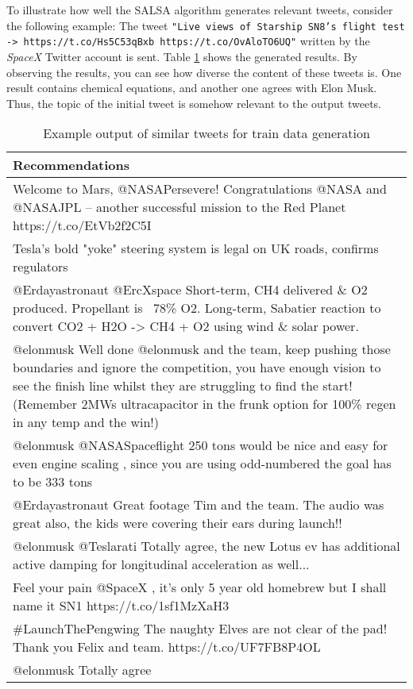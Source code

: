 To illustrate how well the SALSA algorithm generates relevant tweets, consider the following example:
The tweet \texttt{"Live views of Starship SN8’s flight test -> https://t.co/Hs5C53qBxb https://t.co/OvAloTO6UQ"} written by the \emph{SpaceX} Twitter account is sent. Table \ref{tab:example-train-data} shows the generated results. By observing the results, you can see how diverse the content of these tweets is. One result contains chemical equations, and another one agrees with Elon Musk. Thus, the topic of the initial tweet is somehow relevant to the output tweets.

\begin{table}[!ht]
    \centering
    \caption{Example output of similar tweets for train data generation}
    \label{tab:example-train-data}
    \begin{tabular}{|m{}|}
        \hline
        \textbf{Recommendations} \\
        \hline
        Welcome to Mars, @NASAPersevere! Congratulations @NASA and @NASAJPL – another successful mission to the Red Planet https://t.co/EtVb2f2C5I \\
        \hline
        Tesla’s bold "yoke" steering system is legal on UK roads, confirms regulators \\
        \hline
        @Erdayastronaut @ErcXspace Short-term, CH4 delivered \& O2 produced. Propellant is ~78\% O2. Long-term, Sabatier reaction to convert CO2 + H2O -> CH4 + O2 using wind \& solar power. \\
        \hline
        @elonmusk Well done @elonmusk and the team, keep pushing those boundaries and ignore the competition,  you have enough vision to see the finish line whilst they are struggling to find the start! (Remember 2MWs ultracapacitor in the frunk option for 100\% regen in any temp and the win!) \\
        \hline
        @elonmusk @NASASpaceflight 250 tons would be nice and easy for even engine scaling , since you are using odd-numbered the goal has to be 333 tons \\
        \hline
        @Erdayastronaut Great footage Tim and the team. The audio was great also,  the kids were covering their ears during launch!! \\
        \hline
        @elonmusk @Teslarati Totally agree, the new Lotus ev has additional active damping for longitudinal acceleration as well... \\
        \hline
        Feel your pain @SpaceX , it's only 5 year old homebrew but I shall name it SN1 https://t.co/1sf1MzXaH3 \\
        \hline
        \#LaunchThePengwing The naughty Elves are not clear of the pad! Thank you Felix and team. https://t.co/UF7FB8P4OL \\
        \hline
        @elonmusk Totally agree \\
        \hline
    \end{tabular}
\end{table}


